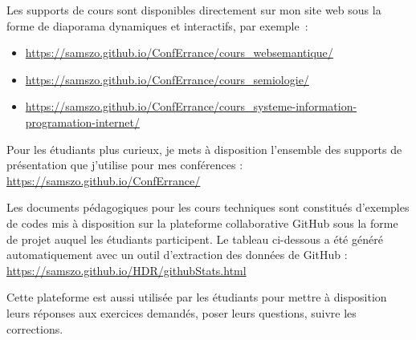 \documentclass[
  a4paper,
  DIV=11,
  numbers=noendperiod]{scrreprt}
\begin{document}
Les supports de cours sont disponibles directement sur mon site web sous
la forme de diaporama dynamiques et interactifs, par exemple~:

\begin{itemize}
\item
  \url{https://samszo.github.io/ConfErrance/cours_websemantique/}
\item
  \url{https://samszo.github.io/ConfErrance/cours_semiologie/}
\item
  \url{https://samszo.github.io/ConfErrance/cours_systeme-information-programation-internet/}
\end{itemize}

Pour les étudiants plus curieux, je mets à disposition l'ensemble des
supports de présentation que j'utilise pour mes conférences :
\url{https://samszo.github.io/ConfErrance/}

Les documents pédagogiques pour les cours techniques sont constitués
d'exemples de codes mis à disposition sur la plateforme collaborative
GitHub sous la forme de projet auquel les étudiants participent. Le
tableau ci-dessous a été généré automatiquement avec un outil
d'extraction des données de GitHub :
\url{https://samszo.github.io/HDR/githubStats.html}

Cette plateforme est aussi utilisée par les étudiants pour mettre à
disposition leurs réponses aux exercices demandés, poser leurs
questions, suivre les corrections.~
\end{document}
